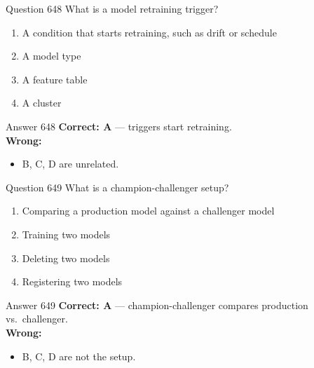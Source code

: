 \documentclass[aspectratio=169,11pt]{beamer}
\begin{document}
	\begin{frame}{Question 648}
		What is a model retraining trigger?
		\begin{enumerate}[label=\Alph*.]
			\item A condition that starts retraining, such as drift or schedule
			\item A model type
			\item A feature table
			\item A cluster
		\end{enumerate}
	\end{frame}
	\begin{frame}{Answer 648}
		\textbf{Correct: A} --- triggers start retraining.\\
		\vspace{0.5em}
		\textbf{Wrong:}
		\begin{itemize}
			\item B, C, D are unrelated.
		\end{itemize}
	\end{frame}
	
	\begin{frame}{Question 649}
		What is a champion-challenger setup?
		\begin{enumerate}[label=\Alph*.]
			\item Comparing a production model against a challenger model
			\item Training two models
			\item Deleting two models
			\item Registering two models
		\end{enumerate}
	\end{frame}
	\begin{frame}{Answer 649}
		\textbf{Correct: A} --- champion-challenger compares production vs.\ challenger.\\
		\vspace{0.5em}
		\textbf{Wrong:}
		\begin{itemize}
			\item B, C, D are not the setup.
		\end{itemize}
	\end{frame}
	
\end{document}
